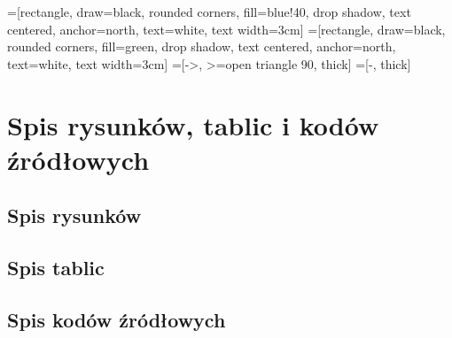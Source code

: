 \documentclass[a4paper,12pt]{article}
\begin{document}
=[rectangle, draw=black, rounded corners, fill=blue!40, drop shadow,
        text centered, anchor=north, text=white, text width=3cm]
=[rectangle, draw=black, rounded corners, fill=green, drop shadow,
        text centered, anchor=north, text=white, text width=3cm]
=[->, >=open triangle 90, thick]
=[-, thick]
\lstset{numbers=left, stepnumber=1, numbersep=10pt, frame=single}
\lstset{frameround=tttt}
\renewcommand{\lstlistlistingname}{\vspace*{-13mm}}
\renewcommand{\listfigurename}{\vspace*{-13mm}}
\renewcommand{\listtablename}{\vspace*{-13mm}}
\renewcommand*{\refname}{\vspace*{-13mm}}
\renewcommand{\lstlistingname}{Kod źródłowy} 


\tableofcontents 
{}
\clearpage

\section{Spis rysunków, tablic i kodów źródłowych}
\subsection{Spis rysunków}
\renewcommand*\numberline[1]{Rysunek\,#1:\indent}
\listoffigures
\subsection{Spis tablic}
\renewcommand*\numberline[1]{Tablica\,#1:\indent}
\listoftables
\subsection{Spis kodów źródłowych}
\renewcommand*\numberline[1]{Kod źródłowy\,#1:\indent}
\lstlistoflistings
\end{document}
